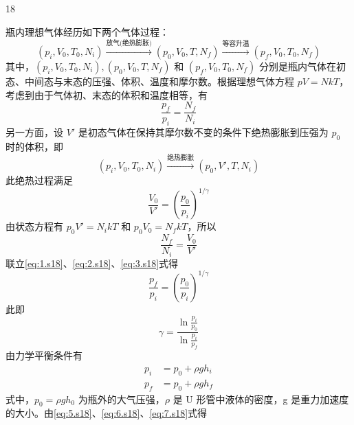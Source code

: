 \begin{solution}{18}
    \begin{subsolution}
        瓶内理想气体经历如下两个气体过程：
        \begin{equation*}
            (p_i, V_0, T_0, N_i) \xrightarrow{\text{放气(绝热膨胀)}} (p_0, V_0, T, N_f) \xrightarrow{\text{等容升温}} (p_f, V_0, T_0, N_f)
        \end{equation*}
        其中，$(p_i, V_0, T_0, N_i), (p_0, V_0, T, N_f)$ 和 $(p_f, V_0, T_0, N_f)$ 分别是瓶内气体在初态、中间态与末态的压强、体积、温度和摩尔数。根据理想气体方程 $pV = NkT$，考虑到由于气体初、末态的体积和温度相等，有
        \begin{equation}
            \frac{p_f}{p_i} = \frac{N_f}{N_i}
            \label{eq:1.s18}
        \end{equation}
        另一方面，设 $V'$ 是初态气体在保持其摩尔数不变的条件下绝热膨胀到压强为 $p_0$ 时的体积，即
        \begin{equation*}
            (p_i, V_0, T_0, N_i) \xrightarrow{\text{绝热膨胀}} (p_0, V', T, N_i)
        \end{equation*}
        此绝热过程满足
        \begin{equation}
            \frac{V_0}{V'} = \left(\frac{p_0}{p_i}\right)^{1/\gamma}
            \label{eq:2.s18}
        \end{equation}
        由状态方程有 $p_0 V' = N_i kT$ 和 $p_0 V_0 = N_f kT$，所以
        \begin{equation}
            \frac{N_f}{N_i} = \frac{V_0}{V'}
            \label{eq:3.s18}
        \end{equation}
        联立\eqref{eq:1.s18}、\eqref{eq:2.s18}、\eqref{eq:3.s18}式得
        \begin{equation}
            \frac{p_f}{p_i} = \left(\frac{p_0}{p_i}\right)^{1/\gamma}
            \label{eq:4.s18}
        \end{equation}
        此即
        \begin{equation}
            \gamma = \frac{\ln \frac{p_i}{p_0}}{\ln \frac{p_i}{p_f}}
            \label{eq:5.s18}
        \end{equation}
        由力学平衡条件有
        \begin{align}
            p_i &= p_0 + \rho g h_i \label{eq:6.s18} \\
            p_f &= p_0 + \rho g h_f \label{eq:7.s18}
        \end{align}
        式中，$p_0 = \rho g h_0$ 为瓶外的大气压强，$\rho$ 是 U 形管中液体的密度，g 是重力加速度的大小。由\eqref{eq:5.s18}、\eqref{eq:6.s18}、\eqref{eq:7.s18}式得

\end{subsolution}
\end{solution}
